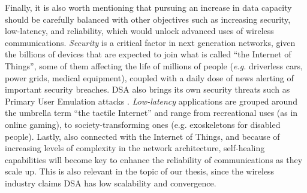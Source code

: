 Finally, it is also worth mentioning that pursuing an increase in data capacity should be carefully balanced with other objectives such as increasing security, low-latency, and reliability, which would unlock advanced uses of wireless communications. \emph{Security} is a critical factor in next generation networks, given the billions of devices that are expected to join what is called \enquote{the Internet of Things}, some of them affecting the life of millions of people (\textit{e.g.} driverless cars, power grids, medical equipment), coupled with a daily dose of news alerting of important security breaches. DSA also brings its own security threats such as Primary User Emulation attacks \cite{Chen2008}. \emph{Low-latency} applications are grouped around the umbrella term \enquote{the tactile Internet} \cite{Fettweis2014} and range from recreational uses (as in online gaming), to society-transforming ones (e.g. exoskeletons for disabled people). Lastly, also connected with the Internet of Things, and because of increasing levels of complexity in the network architecture, self-healing capabilities \cite{Zhang2013_self} will become key to enhance the reliability of communications as they scale up. This is also relevant in the topic of our thesis, since the wireless industry claims DSA has low scalability and convergence. 


 




